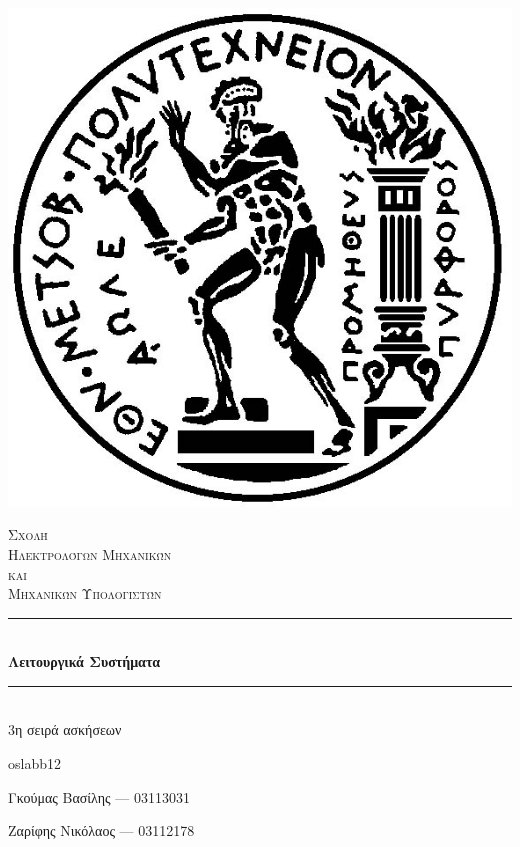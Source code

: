 \documentclass[12pt]{article}
\newcommand{\HRule}{\rule{\linewidth}{0.5mm}}
\begin{document}
\begin{titlepage}
\centering

\includegraphics[scale=0.3]{pyrforos.jpg}

\textsc{\LARGE Σχολή \\ Ηλεκτρολόγων Μηχανικών \\[-3pt] και \\[6pt] Μηχανικών Υπολογιστών}

\vspace{1cm}

\HRule \\[0.4cm]
{\huge \bfseries Λειτουργικά Συστήματα\\} %

\vspace{0.4cm}
\HRule \\[0.4cm]

\Large{3η σειρά ασκήσεων\\}


\vfill
\begin{center}
\large
\textlatin{oslabb12}

Γκούμας Βασίλης ---  03113031 

Ζαρίφης Νικόλαος --- 03112178

\end{center}

\end{titlepage}
\end{document}
